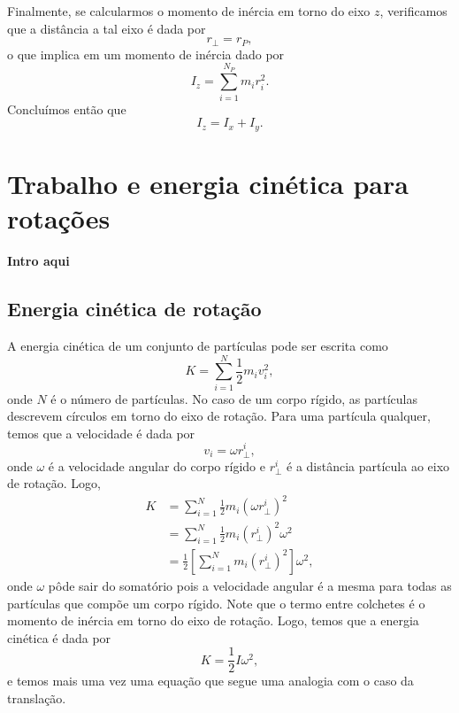 Finalmente, se calcularmos o momento de inércia em torno do eixo $z$, verificamos que a distância a tal eixo é dada por
\begin{equation}
    r_\perp = r_P,
\end{equation}
%
o que implica em um momento de inércia dado por
\begin{equation}
    I_z = \sum_{i = 1}^{N_P} m_i r_i^2.
\end{equation}
%
Concluímos então que
\begin{equation}
    I_z = I_x + I_y.
\end{equation}

\section{Trabalho e energia cinética para rotações}

\textbf{Intro aqui}

\subsection{Energia cinética de rotação}

A energia cinética de um conjunto de partículas pode ser escrita como
\begin{equation}
	K = \sum_{i=1}^N \frac{1}{2} m_i v_i^2,
\end{equation}
%
onde $N$ é o número de partículas. No caso de um corpo rígido, as partículas descrevem círculos em torno do eixo de rotação. Para uma partícula qualquer, temos que a velocidade é dada por
\begin{equation}
    v_i = \omega r_\perp^i,
\end{equation}
%
onde $\omega$ é a velocidade angular do corpo rígido e $r_\perp^i$ é a distância  partícula ao eixo de rotação. Logo,
\begin{align}
	K &= \sum_{i=1}^{N} \frac{1}{2} m_i (\omega r_\perp^i)^2 \\
	&= \sum_{i=1}^N \frac{1}{2} m_i (r_\perp^i)^2 \omega^2 \\
	&= \frac{1}{2} \left[\sum_{i=1}^N m_i (r_\perp^i)^2\right] \omega^2,
\end{align}
%
onde $\omega$ pôde sair do somatório pois a velocidade angular é a mesma para todas as partículas que compõe um corpo rígido. Note que o termo entre colchetes é o momento de inércia em torno do eixo de rotação. Logo, temos que a energia cinética é dada por
\begin{equation}
	K = \frac{1}{2} I \omega^2,
\end{equation}
%
e temos mais uma vez uma equação que segue uma analogia com o caso da translação.

